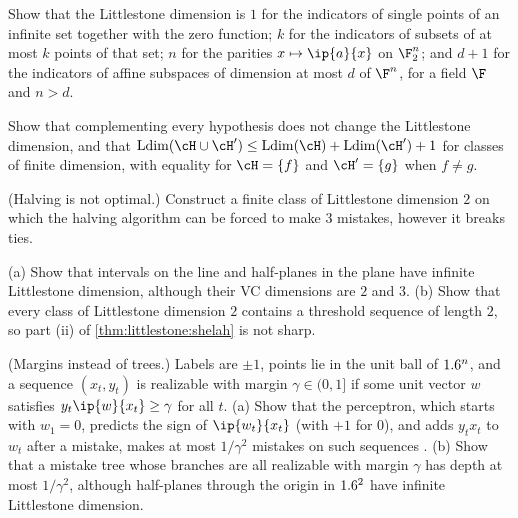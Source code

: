 \begin{refsection}
\begin{exercises}
\item \consolidation Show that the Littlestone dimension is $1$ for the indicators of single points of an infinite set together with the zero function; $k$ for the indicators of subsets of at most $k$ points of that set; $n$ for the parities $x\mapsto\ip{a}{x}$ on $\F_2^n$; and $d+1$ for the indicators of affine subspaces of dimension at most $d$ of $\F^n$, for a field $\F$ and $n>d$. \label{ex:littlestone:compute}
\item \consolidation\hard Show that complementing every hypothesis does not change the Littlestone dimension, and that $\littlestoneLdim(\cH\cup\cH')\le\littlestoneLdim(\cH)+\littlestoneLdim(\cH')+1$ for classes of finite dimension, with equality for $\cH=\{f\}$ and $\cH'=\{g\}$ when $f\ne g$. 
\item \consolidation\hard (Halving is not optimal.) Construct a finite class of Littlestone dimension $2$ on which the halving algorithm can be forced to make $3$ mistakes, however it breaks ties. \label{ex:littlestone:halving}
\item \consolidation\hard (a) Show that intervals on the line and half-planes in the plane have infinite Littlestone dimension, although their VC dimensions are $2$ and $3$. (b) Show that every class of Littlestone dimension $2$ contains a threshold sequence of length $2$, so part (ii) of \cref{thm:littlestone:shelah} is not sharp. 
\item \transfer\hard (Margins instead of trees.) Labels are $\pm1$, points lie in the unit ball of $1.6^n$, and a sequence $(x_t,y_t)$ is realizable with margin $\gamma\in(0,1]$ if some unit vector $w$ satisfies $y_t\ip{w}{x_t}\ge\gamma$ for all $t$. (a) Show that the perceptron, which starts with $w_1=0$, predicts the sign of $\ip{w_t}{x_t}$ (with $+1$ for $0$), and adds $y_tx_t$ to $w_t$ after a mistake, makes at most $1/\gamma^2$ mistakes on such sequences \parencite{Novikoff1962}. (b) Show that a mistake tree whose branches are all realizable with margin $\gamma$ has depth at most $1/\gamma^2$, although half-planes through the origin in $1.6^2$ have infinite Littlestone dimension. \label{ex:littlestone:perceptron}

\end{exercises}
\end{refsection}
